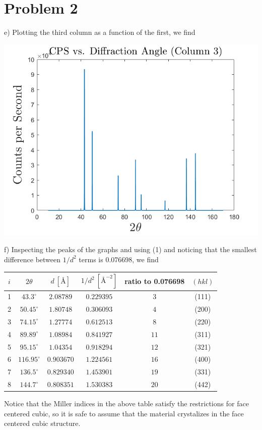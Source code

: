 \documentclass{article}
\begin{document}
\section*{Problem 2}
e) Plotting the third column as a function of the first, we find
\begin{center}
    \includegraphics[scale = 0.75]{column3.png}
\end{center}

f) Inspecting the peaks of the graphs and using (1) and noticing that the smallest difference between $1/d^2$ terms is 0.076698, we find 
\begin{center}
    \begin{tabular}{c|c|c|c|c|c}
        $i$ & $2\theta$ & $d\: [\text{\AA}]$ & $1/d^2\: [\text{\AA}^{-2}]$  & ratio to 0.076698 & $(hkl)$\\
        \hline
        1 & $43.3^{\circ}$ & $2.08789$ & $0.229395$ & $3$ & (111)\\
        2 & $50.45^{\circ}$ & $1.80748$ & $0.306093$ & $4$ & (200)\\
        3 & $74.15^{\circ}$ & $1.27774$ & $0.612513$ & $8$ & (220)\\
        4 & $89.89^{\circ}$ & $1.08984$ & $0.841927$ & $11$ & (311)\\
        5 & $95.15^{\circ}$ & $1.04354$ & $0.918294$ & $12$ & (321)\\
        6 & $116.95^{\circ}$ & $0.903670$ & $1.224561$ & $16$ & (400)\\
        7 & $136.5^{\circ}$ & $0.829340$ & $1.453901$ & $19$ & (331)\\
        8 & $144.7^{\circ}$ & $0.808351$ & $1.530383$ & $20$ & (442)\\
    \end{tabular}
\end{center}
Notice that the Miller indices in the above table satisfy the restrictions for face centered cubic, so it is safe to assume that the material crystalizes in the face centered cubic structure.
\newline
\end{document}

